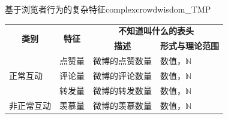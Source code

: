\documentclass[a4paper,AutoFakeBold,oneside,12pt]{book}
\begin{document}
\begin{bupttable}{基于浏览者行为的复杂特征}{complexcrowdwisdom_TMP}
	\begin{tabular}{l|l|l|l}
		\hline
		\multicolumn{1}{c|}{\multirow{2}{*}{\textbf{类别}}} & \multicolumn{1}{c|}{\multirow{2}{*}{\textbf{特征}}} & \multicolumn{2}{c}{\textbf{不知道叫什么的表头}}                                               \\
		\cline{3-4}
		                                                    &                                                     & \multicolumn{1}{c|}{\textbf{描述}}              & \multicolumn{1}{c}{\textbf{形式与理论范围}} \\
		\hline
		\multirow{3}{*}{正常互动}                           & 点赞量                                              & 微博的点赞数量                                  & 数值，$\mathbb{N}$                          \\
		\cline{2-4}
		                                                    & 评论量                                              & 微博的评论数量                                  & 数值，$\mathbb{N}$                          \\
		\cline{2-4}
		                                                    & 转发量                                              & 微博的转发数量                                  & 数值，$\mathbb{N}$                          \\
		\hline
		非正常互动                                          & 羡慕量                                              & 微博的羡慕数量                                  & 数值，$\mathbb{N}$                          \\
		\hline
	\end{tabular}
\end{bupttable}
\end{document}

